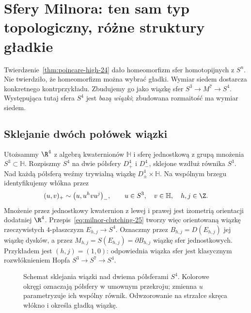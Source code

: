 \chapter{Sfery Milnora: ten sam typ topologiczny,
 różne struktury gładkie}
\label{ch:sfery-Milnora}

Twierdzenie~\ref{thm:poincare-high-24}
dało homeomorfizm sfer homotopijnych
z $S^n$. Nie twierdziło, że homeomorfizm
można wybrać gładki. Wymiar siedem
dostarcza konkretnego kontrprzykładu.
Zbudujemy go jako wiązkę sfer
$S^3\to M^7\to S^4$.
Występująca tutaj sfera $S^4$
jest \emph{bazą wiązki}; zbudowana
rozmaitość ma wymiar siedem.

\section{Sklejanie dwóch połówek wiązki}
\label{sec:milnor-clutching-25}

Utożsammy $\R^4$ z algebrą kwaternionów
$\mathbb H$ i sferę jednostkową
z grupą mnożenia $S^3\subset\mathbb H$.
Rozpiszmy $S^4$ na dwie półsfery
$D^4_+$ i $D^4_-$, sklejone wzdłuż
równika $S^3$. Nad każdą półsferą
weźmy trywialną wiązkę
$D^4_\pm\times\mathbb H$.
Na wspólnym brzegu identyfikujemy
włókna przez
\begin{equation}\label{eq:milnor-clutching-25}
 (u,v)_+\sim
 \bigl(u,u^hvu^j\bigr)_-,
 \qquad u\in S^3,\quad v\in\mathbb H,
 \quad h,j\in\Z.
\end{equation}
Mnożenie przez jednostkowy kwaternion
z lewej i prawej jest izometrią
orientacji dodatniej $\R^4$.
Przepis~\eqref{eq:milnor-clutching-25}
tworzy więc orientowaną wiązkę
rzeczywistych $4$-płaszczyzn
$E_{h,j}\to S^4$. Oznaczmy przez
$B_{h,j}=D(E_{h,j})$ jej wiązkę
dysków, a przez
$M_{h,j}=S(E_{h,j})=\partial B_{h,j}$
wiązkę sfer jednostkowych.
Przykładem jest $(h,j)=(1,0)$:
odpowiednia wiązka sfer jest
klasycznym rozwłóknieniem Hopfa
$S^3\to S^7\to S^4$.

\begin{figure}[htbp]
\centering
{}
\caption{Schemat sklejania wiązki nad dwiema
półsferami $S^4$. Kolorowe okręgi oznaczają
półsfery w umownym przekroju; zmienna $u$
parametryzuje ich wspólny równik. Odwzorowanie na strzałce
skręca włókno i określa gładką wiązkę.}
\label{fig:milnor-clutching-25}
\end{figure}


